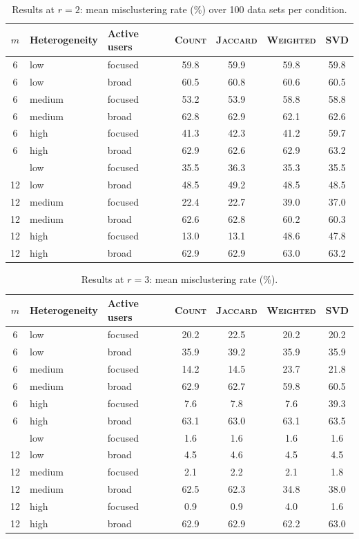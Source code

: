 \begin{table}[H]
\centering\small
\caption{Results at $r=2$: mean misclustering rate (\%) over 100 data sets per condition.}
\label{tab:main}
\begin{tabular}{@{}cllcccc@{}}
\toprule
$m$ & Heterogeneity & Active users & \textsc{Count} & \textsc{Jaccard} & \textsc{Weighted} & \textsc{SVD} \\
\midrule
6 & low & focused & 59.8 & 59.9 & 59.8 & 59.8 \\
6 & low & broad & 60.5 & 60.8 & 60.6 & 60.5 \\
6 & medium & focused & 53.2 & 53.9 & 58.8 & 58.8 \\
6 & medium & broad & 62.8 & 62.9 & 62.1 & 62.6 \\
6 & high & focused & 41.3 & 42.3 & 41.2 & 59.7 \\
6 & high & broad & 62.9 & 62.6 & 62.9 & 63.2 \\
\addlinespace
12 & low & focused & 35.5 & 36.3 & 35.3 & 35.5 \\
12 & low & broad & 48.5 & 49.2 & 48.5 & 48.5 \\
12 & medium & focused & 22.4 & 22.7 & 39.0 & 37.0 \\
12 & medium & broad & 62.6 & 62.8 & 60.2 & 60.3 \\
12 & high & focused & 13.0 & 13.1 & 48.6 & 47.8 \\
12 & high & broad & 62.9 & 62.9 & 63.0 & 63.2 \\
\bottomrule
\end{tabular}
\end{table}
\begin{table}[H]
\centering\small
\caption{Results at $r=3$: mean misclustering rate (\%).}
\label{tab:r3}
\begin{tabular}{@{}cllcccc@{}}
\toprule
$m$ & Heterogeneity & Active users & \textsc{Count} & \textsc{Jaccard} & \textsc{Weighted} & \textsc{SVD} \\
\midrule
6 & low & focused & 20.2 & 22.5 & 20.2 & 20.2 \\
6 & low & broad & 35.9 & 39.2 & 35.9 & 35.9 \\
6 & medium & focused & 14.2 & 14.5 & 23.7 & 21.8 \\
6 & medium & broad & 62.9 & 62.7 & 59.8 & 60.5 \\
6 & high & focused & 7.6 & 7.8 & 7.6 & 39.3 \\
6 & high & broad & 63.1 & 63.0 & 63.1 & 63.5 \\
\addlinespace
12 & low & focused & 1.6 & 1.6 & 1.6 & 1.6 \\
12 & low & broad & 4.5 & 4.6 & 4.5 & 4.5 \\
12 & medium & focused & 2.1 & 2.2 & 2.1 & 1.8 \\
12 & medium & broad & 62.5 & 62.3 & 34.8 & 38.0 \\
12 & high & focused & 0.9 & 0.9 & 4.0 & 1.6 \\
12 & high & broad & 62.9 & 62.9 & 62.2 & 63.0 \\
\bottomrule
\end{tabular}
\end{table}
